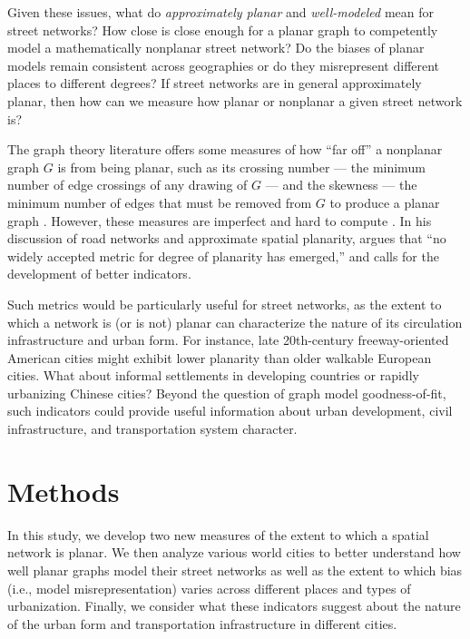 \documentclass[Afour,sageh,times]{sagej}
\begin{document}
Given these issues, what do \emph{approximately planar} and \emph{well-modeled} mean for street networks? How close is close enough for a planar graph to competently model a mathematically nonplanar street network? Do the biases of planar models remain consistent across geographies or do they misrepresent different places to different degrees? If street networks are in general approximately planar, then how can we measure how planar or nonplanar a given street network is?

The graph theory literature offers some measures of how \enquote{far off} a nonplanar graph $G$ is from being planar, such as its crossing number --- the minimum number of edge crossings of any drawing of $G$ --- and the skewness --- the minimum number of edges that must be removed from $G$ to produce a planar graph \citep{liebers_planarizing_2001,szekely_successful_2004,chimani_non-planar_2009}. However, these measures are imperfect and hard to compute \citep{chimani_vertex_2012,szekely_successful_2004}. In his discussion of road networks and approximate spatial planarity, \citet[p.~133]{newman_networks:_2010} argues that \enquote{no widely accepted metric for degree of planarity has emerged,} and calls for the development of better indicators.

Such metrics would be particularly useful for street networks, as the extent to which a network is (or is not) planar can characterize the nature of its circulation infrastructure and urban form. For instance, late 20th-century freeway-oriented American cities might exhibit lower planarity than older walkable European cities. What about informal settlements in developing countries or rapidly urbanizing Chinese cities? Beyond the question of graph model goodness-of-fit, such indicators could provide useful information about urban development, civil infrastructure, and transportation system character.



\section{Methods}

In this study, we develop two new measures of the extent to which a spatial network is planar. We then analyze various world cities to better understand how well planar graphs model their street networks as well as the extent to which bias (i.e., model misrepresentation) varies across different places and types of urbanization. Finally, we consider what these indicators suggest about the nature of the urban form and transportation infrastructure in different cities.
\end{document}
